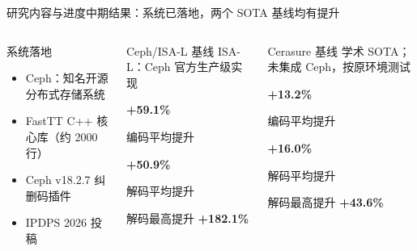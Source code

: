 \begin{frame}{研究内容与进度}{中期结果：系统已落地，两个 SOTA 基线均有提升}

    \begin{columns}[T,onlytextwidth]
        \begin{block}{系统落地}
            \footnotesize
            \begin{itemize}
                \setlength{\itemsep}{4pt}
                \item Ceph：知名开源\\分布式存储系统
                \item FastTT C++ 核心库（约 2000 行）
                \item Ceph v18.2.7 纠删码插件
                \item IPDPS 2026 投稿
            \end{itemize}
        \end{block}

        \begin{block}{Ceph/ISA-L 基线}
            \centering
            \scriptsize ISA-L：Ceph 官方生产级实现

            \vspace{0.35em}
            \Large\textbf{+59.1\%}

            \footnotesize 编码平均提升

            \vspace{0.35em}
            \Large\textbf{+50.9\%}

            \footnotesize 解码平均提升

            \vspace{0.25em}
            \scriptsize 解码最高提升 \textbf{+182.1\%}
        \end{block}

        \begin{block}{Cerasure 基线}
            \centering
            \scriptsize 学术 SOTA；未集成 Ceph，按原环境测试

            \vspace{0.35em}
            \Large\textbf{+13.2\%}

            \footnotesize 编码平均提升

            \vspace{0.35em}
            \Large\textbf{+16.0\%}

            \footnotesize 解码平均提升

            \vspace{0.25em}
            \scriptsize 解码最高提升 \textbf{+43.6\%}
        \end{block}
    \end{columns}

\end{frame}
